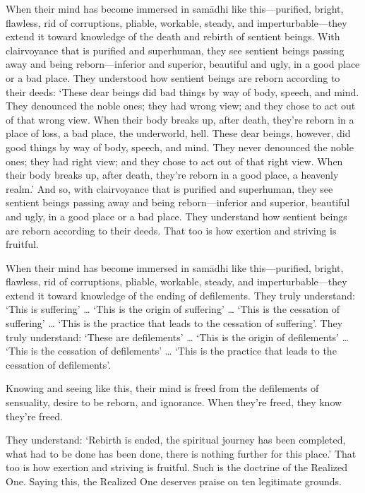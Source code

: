 \documentclass[12pt,openany]{book}%
\begin{document}
When their mind has become immersed in \textsanskrit{samādhi} like this—purified, bright, flawless, rid of corruptions, pliable, workable, steady, and imperturbable—they extend it toward knowledge of the death and rebirth of sentient beings. With clairvoyance that is purified and superhuman, they see sentient beings passing away and being reborn—inferior and superior, beautiful and ugly, in a good place or a bad place. They understood how sentient beings are reborn according to their deeds: ‘These dear beings did bad things by way of body, speech, and mind. They denounced the noble ones; they had wrong view; and they chose to act out of that wrong view. When their body breaks up, after death, they’re reborn in a place of loss, a bad place, the underworld, hell. These dear beings, however, did good things by way of body, speech, and mind. They never denounced the noble ones; they had right view; and they chose to act out of that right view. When their body breaks up, after death, they’re reborn in a good place, a heavenly realm.’ And so, with clairvoyance that is purified and superhuman, they see sentient beings passing away and being reborn—inferior and superior, beautiful and ugly, in a good place or a bad place. They understand how sentient beings are reborn according to their deeds. That too is how exertion and striving is fruitful. 

When their mind has become immersed in \textsanskrit{samādhi} like this—purified, bright, flawless, rid of corruptions, pliable, workable, steady, and imperturbable—they extend it toward knowledge of the ending of defilements. They truly understand: ‘This is suffering’ … ‘This is the origin of suffering’ … ‘This is the cessation of suffering’ … ‘This is the practice that leads to the cessation of suffering’. They truly understand: ‘These are defilements’ … ‘This is the origin of defilements’ … ‘This is the cessation of defilements’ … ‘This is the practice that leads to the cessation of defilements’. 

Knowing and seeing like this, their mind is freed from the defilements of sensuality, desire to be reborn, and ignorance. When they’re freed, they know they’re freed. 

They understand: ‘Rebirth is ended, the spiritual journey has been completed, what had to be done has been done, there is nothing further for this place.’ That too is how exertion and striving is fruitful. Such is the doctrine of the Realized One. Saying this, the Realized One deserves praise on ten legitimate grounds. 
\end{document}
